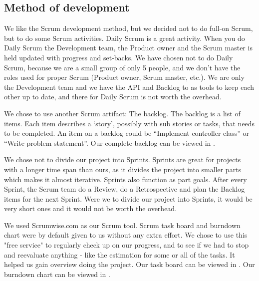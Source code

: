 \subsection{Method of development}
We like the Scrum development method, but we decided not to do full-on Scrum, but to do some Scrum activities. Daily Scrum is a great activity. When you do Daily Scrum the Development team, the Product owner and the Scrum master is held updated with progress and set-backs. We have chosen not to do Daily Scrum, because we are a small group of only 5 people, and we don't have the roles used for proper Scrum (Product owner, Scrum master, etc.). We are only the Development team and we have the API and Backlog to as tools to keep each other up to date, and there for Daily Scrum is not worth the overhead.

We chose to use another Scrum artifact: The backlog. The backlog is a list of items. Each item describes a `story', possibly with sub stories or tasks, that needs to be completed. An item on a backlog could be ``Implement controller class'' or ``Write problem statement''. Our complete backlog can be viewed in .

We chose not to divide our project into Sprints. Sprints are great for projects with a longer time span than ours, as it divides the project into smaller parts which makes it almost iterative. Sprints also function as part goals. After every Sprint, the Scrum team do a Review, do a Retrospective and plan the Backlog items for the next Sprint. Were we to divide our project into Sprints, it would be very short ones and it would not be worth the overhead.

We used Scrumwise.com as our Scrum tool. Scrum task board and burndown chart were by default given to us without any extra effort. We chose to use this "free service" to regularly check up on our progress, and to see if we had to stop and reevaluate anything - like the estimation for some or all of the tasks. It helped us gain overview doing the project. Our task board can be viewed in . Our burndown chart can be viewed in .